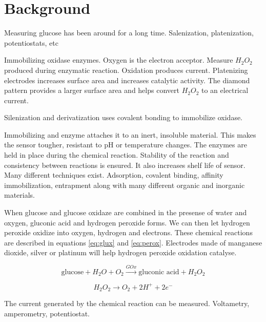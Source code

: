 \section{Background}

Measuring glucose has been around for a long time. \cite{Cramp:1967}
 Salenization, platenization, potentiostats, etc

Immobilizing oxidase enzymes. Oxygen is the electron acceptor. Measure $ H_{2}O_{2}$ produced during enzymatic reaction. Oxidation produces current. Platenizing electrodes increases surface area and increases catalytic activity. The diamond pattern provides a larger surface area and helps convert $ H_{2}O_{2}$ to an electrical current. 
\cite{Zhang:1996}

Silenization and derivatization uses covalent bonding to immobilize oxidase. \cite{Urban:1991}

Immobilizing and enzyme attaches it to an inert, insoluble material. This makes the sensor tougher, resistant to pH or temperature changes. The enzymes are held in place during the chemical reaction. Stability of the reaction and consistency between reactions is ensured. It also increases shelf life of sensor. Many different techniques exist. Adsorption, covalent binding, affinity immobilization, entrapment along with many different organic and inorganic materials. \cite{Datta:2013} 

When glucose and glucose oxidaze are combined in the presense of water and oxygen, gluconic acid and hydrogen peroxide forms. We can then let hydrogen peroxide oxidize into oxygen, hydrogen and electrons. These chemical reactions are described in equations \ref{eq:glux} and \ref{eq:perox}. Electrodes made of manganese dioxide, silver or platinum will help hydrogen peroxide oxidation catalyse. \cite{Raba:1995}

\begin{equation} \label{eq:glux}
\text{glucose} + H_2O + O_2 \xrightarrow{GOx}  \text{gluconic acid} + H_2O_2
\end{equation}

\begin{equation} \label{eq:perox}
H_2O_2 \rightarrow O_2 + 2H^+ + 2e^-
\end{equation}


The current generated by the chemical reaction can be measured. Voltametry, amperometry, potentiostat. 